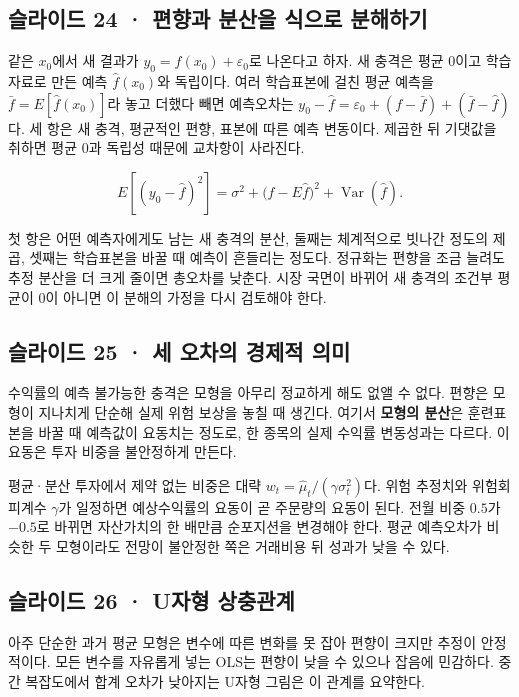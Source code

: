 \documentclass[11pt,a4paper]{article}
\begin{document}
\subsection{슬라이드 24 · 편향과 분산을 식으로 분해하기}
같은 $x_0$에서 새 결과가 $y_0=f(x_0)+\varepsilon_0$로 나온다고 하자. 새 충격은 평균 0이고 학습자료로 만든 예측 $\hat f(x_0)$와 독립이다. 여러 학습표본에 걸친 평균 예측을 $\bar f=E[\hat f(x_0)]$라 놓고 더했다 빼면 예측오차는 $y_0-\hat f=\varepsilon_0+(f-\bar f)+(\bar f-\hat f)$다. 세 항은 새 충격, 평균적인 편향, 표본에 따른 예측 변동이다. 제곱한 뒤 기댓값을 취하면 평균 0과 독립성 때문에 교차항이 사라진다.\par

\[
E[(y_0-\hat f)^2]=\sigma^2+
\bigl(f-E\hat f\bigr)^2+
\operatorname{Var}(\hat f).
\]

첫 항은 어떤 예측자에게도 남는 새 충격의 분산, 둘째는 체계적으로 빗나간 정도의 제곱, 셋째는 학습표본을 바꿀 때 예측이 흔들리는 정도다. 정규화는 편향을 조금 늘려도 추정 분산을 더 크게 줄이면 총오차를 낮춘다. 시장 국면이 바뀌어 새 충격의 조건부 평균이 0이 아니면 이 분해의 가정을 다시 검토해야 한다.\par

\subsection{슬라이드 25 · 세 오차의 경제적 의미}
수익률의 예측 불가능한 충격은 모형을 아무리 정교하게 해도 없앨 수 없다. 편향은 모형이 지나치게 단순해 실제 위험 보상을 놓칠 때 생긴다. 여기서 \textbf{모형의 분산}은 훈련표본을 바꿀 때 예측값이 요동치는 정도로, 한 종목의 실제 수익률 변동성과는 다르다. 이 요동은 투자 비중을 불안정하게 만든다.\par

평균·분산 투자에서 제약 없는 비중은 대략 $w_t=\hat\mu_t/(\gamma\sigma_t^2)$다. 위험 추정치와 위험회피계수 $\gamma$가 일정하면 예상수익률의 요동이 곧 주문량의 요동이 된다. 전월 비중 $0.5$가 $-0.5$로 바뀌면 자산가치의 한 배만큼 순포지션을 변경해야 한다. 평균 예측오차가 비슷한 두 모형이라도 전망이 불안정한 쪽은 거래비용 뒤 성과가 낮을 수 있다.\par

\subsection{슬라이드 26 · U자형 상충관계}
아주 단순한 과거 평균 모형은 변수에 따른 변화를 못 잡아 편향이 크지만 추정이 안정적이다. 모든 변수를 자유롭게 넣는 OLS는 편향이 낮을 수 있으나 잡음에 민감하다. 중간 복잡도에서 합계 오차가 낮아지는 U자형 그림은 이 관계를 요약한다.\par
\end{document}
